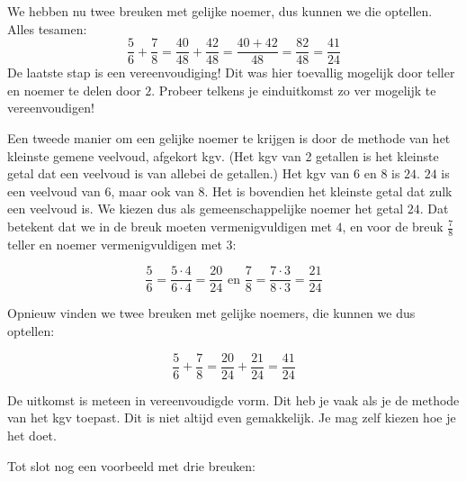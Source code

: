 We hebben nu twee breuken met gelijke noemer, dus kunnen we die optellen. Alles tesamen:
\begin{equation*}
\frac{5}{6}+\frac{7}{8}=\frac{40}{48}+\frac{42}{48}=\frac{40+42}{48}=\frac{82}{48}=\frac{41}{24}
\end{equation*}
De laatste stap is een vereenvoudiging! Dit was hier toevallig mogelijk door teller en noemer te delen door $2$. 
Probeer telkens je einduitkomst zo ver mogelijk te vereenvoudigen!

Een tweede manier om een gelijke noemer te krijgen is door de methode van het kleinste gemene veelvoud, afgekort kgv. (Het kgv van 2 getallen is het kleinste getal dat een veelvoud is van allebei de getallen.) Het kgv van $6$ en $8$ is $24$. $24$ is een veelvoud van $6$, maar ook van $8$. Het is bovendien het kleinste getal dat zulk een veelvoud is. We kiezen dus als gemeenschappelijke noemer het getal $24$. Dat betekent dat we in de breuk  moeten vermenigvuldigen met $4$, en voor de breuk $\frac{7}{8}$ teller en noemer vermenigvuldigen met $3$:

\begin{equation*}
\frac{5}{6} = \frac{5 \cdot 4}{6 \cdot 4}=\frac{20}{24} \text{ en } \frac{7}{8}=\frac{7 \cdot 3}{8 \cdot 3}=\frac{21}{24}
\end{equation*}


Opnieuw vinden we twee breuken met gelijke noemers, die kunnen we dus optellen:

\begin{equation*}
\frac{5}{6}+\frac{7}{8}=\frac{20}{24}+\frac{21}{24}=\frac{41}{24}
\end{equation*}

De uitkomst is meteen in vereenvoudigde vorm. Dit heb je vaak als je de methode van het kgv toepast. Dit is niet altijd even gemakkelijk. Je mag zelf kiezen hoe je het doet.

Tot slot nog een voorbeeld met drie breuken:


